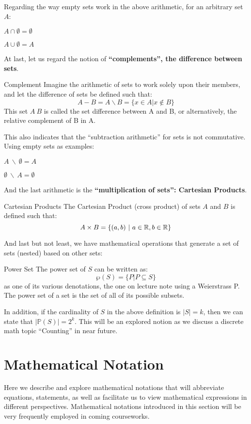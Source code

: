 Regarding the way empty sets work in the above arithmetic, for an arbitrary set $A$:
\begin{bindenum}
    \item $A \cap \emptyset = \emptyset$
    \item $A \cup \emptyset = A$
\end{bindenum}
At last, let us regard the notion of \textbf{``complements'', the difference between sets}.
\begin{ln-define}{Complement}{}
    Imagine the arithmetic of sets to work solely upon their members, and let the difference of sets be defined such that:
    \[A - B = A \backslash B = \{x \in A | x \notin B\}\]
    This set $A \ B$ is called the set difference between A and B, or alternatively, the relative complement of B in A.
\end{ln-define}
This also indicates that the ``subtraction arithmetic'' for sets is not commutative. Using empty sets as examples:
\begin{bindenum}
    \item $A\ \backslash\ \emptyset = A$
    \item $\emptyset\ \backslash\ A = \emptyset$
\end{bindenum}
And the last arithmetic is the \textbf{``multiplication of sets'': Cartesian Products}.
\begin{ln-define}{Cartesian Products}{}
    The Cartesian Product (cross product) of sets $A$ and $B$ is defined such that:
    \[A \times B = \{(a, b)\ |\ a \in \mathbb{R}, b \in \mathbb{R}\}\]
\end{ln-define}
And last but not least, we have mathematical operations that generate a set of sets (nested) based on other sets:
\begin{ln-define}{Power Set}{}
    The power set of $S$ can be written as:
    \[\wp (S) = \{P | P \subseteq S\}\]
    as one of its various denotations, the one on lecture note using a Weierstrass P. \\
    The power set of a set is the set of all of its possible subsets.
\end{ln-define}
In addition, if the cardinality of $S$ in the above definition is $|S| = k$, then we can state that $|\mathbb{P} (S)| = 2^k$. This will be an explored notion as we discuss a discrete math topic ``Counting'' in near future.

\section{Mathematical Notation}
Here we describe and explore mathematical notations that will abbreviate equations, statements, as well as facilitate us to view mathematical expressions in different perspectives. Mathematical notations introduced in this section will be very frequently employed in coming courseworks.

